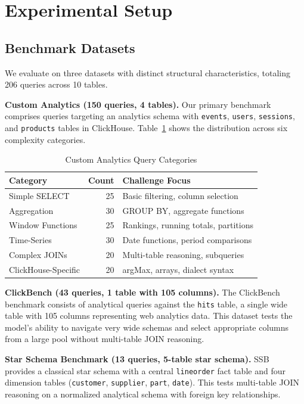 \documentclass[sigconf, nonacm]{acmart}
\begin{document}
\section{Experimental Setup}
\label{sec:setup}

\subsection{Benchmark Datasets}
We evaluate on three datasets with distinct structural characteristics, totaling 206 queries across 10 tables.

\textbf{Custom Analytics (150 queries, 4 tables).} Our primary benchmark comprises queries targeting an analytics schema with \texttt{events}, \texttt{users}, \texttt{sessions}, and \texttt{products} tables in ClickHouse. Table~\ref{tab:categories} shows the distribution across six complexity categories.

\begin{table}[t]
\caption{Custom Analytics Query Categories}
\label{tab:categories}
\centering
\small
\begin{tabular}{lrl}
\toprule
\textbf{Category} & \textbf{Count} & \textbf{Challenge Focus} \\
\midrule
Simple SELECT & 25 & Basic filtering, column selection \\
Aggregation & 30 & GROUP BY, aggregate functions \\
Window Functions & 25 & Rankings, running totals, partitions \\
Time-Series & 30 & Date functions, period comparisons \\
Complex JOINs & 20 & Multi-table reasoning, subqueries \\
ClickHouse-Specific & 20 & argMax, arrays, dialect syntax \\
\bottomrule
\end{tabular}
\end{table}

\textbf{ClickBench (43 queries, 1 table with 105 columns).} The ClickBench~\cite{clickbench2023} benchmark consists of analytical queries against the \texttt{hits} table, a single wide table with 105 columns representing web analytics data. This dataset tests the model's ability to navigate very wide schemas and select appropriate columns from a large pool without multi-table JOIN reasoning.

\textbf{Star Schema Benchmark (13 queries, 5-table star schema).} SSB~\cite{oneil2009ssb} provides a classical star schema with a central \texttt{lineorder} fact table and four dimension tables (\texttt{customer}, \texttt{supplier}, \texttt{part}, \texttt{date}). This tests multi-table JOIN reasoning on a normalized analytical schema with foreign key relationships.
\end{document}

